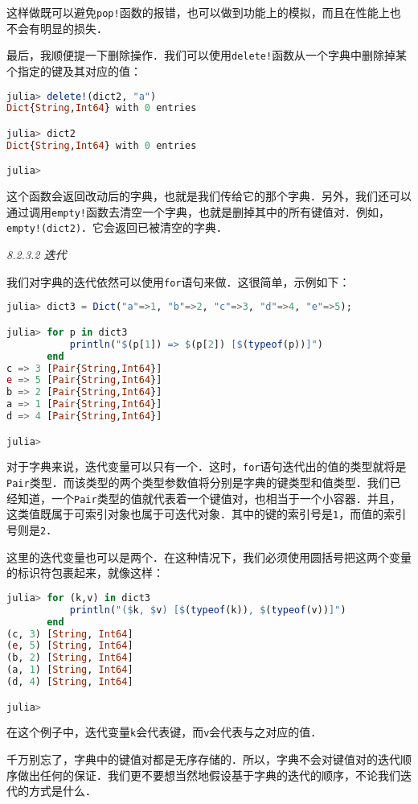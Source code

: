 这样做既可以避免\verb|pop!|函数的报错，也可以做到功能上的模拟，而且在性能上也不会有明显的损失．

最后，我顺便提一下删除操作．我们可以使用\verb|delete!|函数从一个字典中删除掉某个指定的键及其对应的值：
\begin{lstlisting}[language=julia]
julia> delete!(dict2, "a")
Dict{String,Int64} with 0 entries

julia> dict2
Dict{String,Int64} with 0 entries

julia> 
\end{lstlisting}

这个函数会返回改动后的字典，也就是我们传给它的那个字典．另外，我们还可以通过调用\verb|empty!|函数去清空一个字典，也就是删掉其中的所有键值对．例如，\verb|empty!(dict2)|．它会返回已被清空的字典．

\textsl{8.2.3.2 迭代}

我们对字典的迭代依然可以使用\verb|for|语句来做．这很简单，示例如下：
\begin{lstlisting}[language=julia]
julia> dict3 = Dict("a"=>1, "b"=>2, "c"=>3, "d"=>4, "e"=>5);

julia> for p in dict3
           println("$(p[1]) => $(p[2]) [$(typeof(p))]")
       end
c => 3 [Pair{String,Int64}]
e => 5 [Pair{String,Int64}]
b => 2 [Pair{String,Int64}]
a => 1 [Pair{String,Int64}]
d => 4 [Pair{String,Int64}]

julia> 
\end{lstlisting}

对于字典来说，迭代变量可以只有一个．这时，\verb|for|语句迭代出的值的类型就将是\verb|Pair|类型．而该类型的两个类型参数值将分别是字典的键类型和值类型．我们已经知道，一个\verb|Pair|类型的值就代表着一个键值对，也相当于一个小容器．并且，这类值既属于可索引对象也属于可迭代对象．其中的键的索引号是\verb|1|，而值的索引号则是\verb|2|．

这里的迭代变量也可以是两个．在这种情况下，我们必须使用圆括号把这两个变量的标识符包裹起来，就像这样：
\begin{lstlisting}[language=julia]
julia> for (k,v) in dict3
           println("($k, $v) [$(typeof(k)), $(typeof(v))]")
       end
(c, 3) [String, Int64]
(e, 5) [String, Int64]
(b, 2) [String, Int64]
(a, 1) [String, Int64]
(d, 4) [String, Int64]

julia> 
\end{lstlisting}

在这个例子中，迭代变量\verb|k|会代表键，而\verb|v|会代表与之对应的值．

千万别忘了，字典中的键值对都是无序存储的．所以，字典不会对键值对的迭代顺序做出任何的保证．我们更不要想当然地假设基于字典的迭代的顺序，不论我们迭代的方式是什么．

